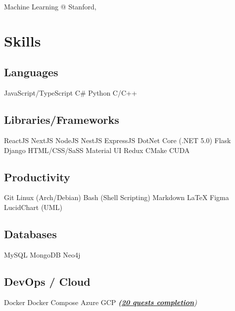\documentclass[]{deedy-resume-openfont}
\begin{document}
\begin{minipage}[t]{0.33\textwidth}
\textbullet{} Machine Learning @ Stanford, 


\section{Skills}

\subsection{Languages}
JavaScript/TypeScript \textbullet{} C\# \textbullet{} Python \textbullet{} C/C++
\sectionsep

\subsection{Libraries/Frameworks}
ReactJS \textbullet{} NextJS \textbullet{} NodeJS \textbullet{} NestJS \textbullet{} ExpressJS  \textbullet{} DotNet Core (.NET 5.0) \textbullet{} Flask \textbullet{} Django \textbullet{} HTML/CSS/SaSS \textbullet{} Material UI \textbullet{} Redux \textbullet{} CMake \textbullet{} CUDA
\sectionsep 

\subsection{Productivity}
Git \textbullet{} Linux (Arch/Debian) \textbullet{} Bash (Shell Scripting) \textbullet{} Markdown \textbullet{} LaTeX \textbullet{} Figma  \textbullet{} LucidChart (UML)
\sectionsep

\subsection{Databases}
MySQL \textbullet{} MongoDB \textbullet{} Neo4j
\sectionsep

\subsection{DevOps / Cloud}
Docker \textbullet{} Docker Compose \textbullet{} Azure \textbullet{} GCP {\footnotesize\textit{\textbf{(\href{https://www.qwiklabs.com/public_profiles/d0984371-b6fe-43de-ae48-a4cbad94d26f}{20 quests completion}})}}
\sectionsep

%
%

\end{minipage} 
\end{document}
